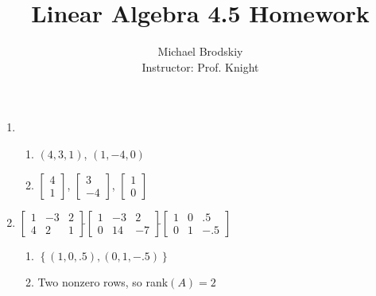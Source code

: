 \documentclass[12pt]{article}
\title{Linear Algebra 4.5 Homework}
\date{}
\author{Michael Brodskiy\\ \small Instructor: Prof. Knight}
\begin{document}
\maketitle

\begin{enumerate}

    \begin{center}
    \underline{Problems 3, 7, 9, 11$^*$, 17$^*$, 23, 29, 35, 39, 41, 47}
    \end{center}

    \setcounter{enumi}{2}

  \item

    \begin{enumerate}

      \item $(4,3,1)$, $(1,-4,0)$

      \item $\begin{bmatrix} 4\\1  \end{bmatrix}$, $\begin{bmatrix} 3\\-4  \end{bmatrix}$, $\begin{bmatrix} 1\\0  \end{bmatrix}$

    \end{enumerate}

    \setcounter{enumi}{6}

  \item $\begin{bmatrix} 1 & -3 & 2\\ 4 & 2 & 1  \end{bmatrix}\widetilde{   }\begin{bmatrix} 1 & -3 & 2\\ 0 & 14 & -7  \end{bmatrix}\widetilde{   }\begin{bmatrix} 1 & 0 & .5\\ 0 & 1 & -.5\end{bmatrix}$

    \begin{enumerate}

      \item $\left\{ (1, 0, .5), (0, 1, -.5) \right\}$

      \item Two nonzero rows, so rank$(A)=2$


\end{enumerate}
\end{enumerate}
\end{document}
